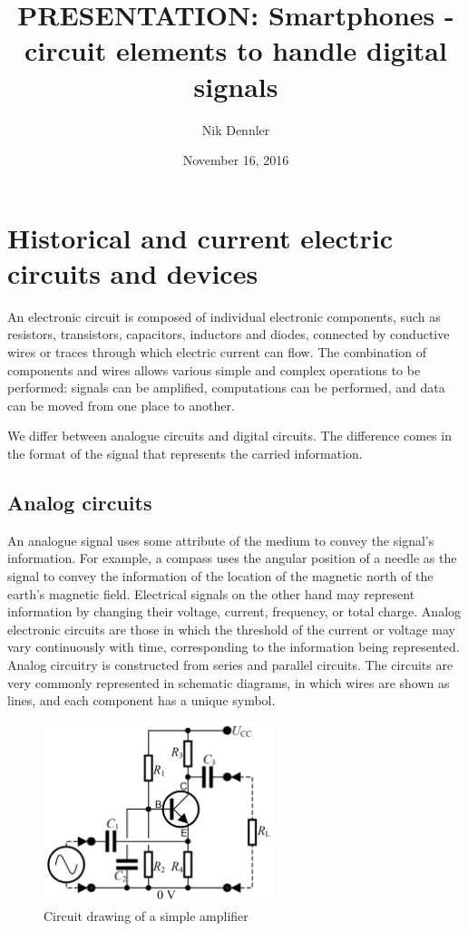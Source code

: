 \documentclass[11pt]{article}
\title{PRESENTATION: Smartphones - circuit elements to handle digital signals}
\author{Nik Dennler}
\date{November 16, 2016}
\begin{document}
\maketitle
\tableofcontents
\clearpage

\section{Historical and current electric circuits and devices}
An electronic circuit is composed of individual electronic components, such as resistors, transistors, capacitors, inductors and diodes, connected by conductive wires or traces through which electric current can flow. The combination of components and wires allows various simple and complex operations to be performed: signals can be amplified, computations can be performed, and data can be moved from one place to another.

We differ between analogue circuits and digital circuits. The difference comes in the format of the signal that represents the carried information. 


\subsection{Analog circuits}
An analogue signal uses some attribute of the medium to convey the signal's information. For example, a compass uses the angular position of a needle as the signal to convey the information of the location of the magnetic north of the earth's magnetic field.  Electrical signals on the other hand may represent information by changing their voltage, current, frequency, or total charge. Analog electronic circuits are those in which the threshold of the current or voltage may vary continuously with time, corresponding to the information being represented. Analog circuitry is constructed from series and parallel circuits. The circuits are very commonly represented in schematic diagrams, in which wires are shown as lines, and each component has a unique symbol. 

\begin{figure}[H]
\centering
\includegraphics[width=0.6\textwidth]{ampcircuit.png}%
\caption{Circuit drawing of a simple amplifier}
\label{fig:amp}
\end{figure}
\end{document}
